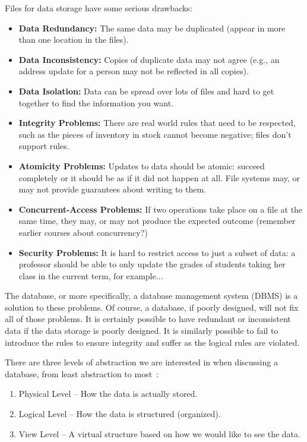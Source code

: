 Files for data storage have some serious drawbacks:
\begin{itemize}
	\item \textbf{Data Redundancy:} The same data may be duplicated (appear in more than one location in the files).
	\item \textbf{Data Inconsistency:} Copies of duplicate data may not agree (e.g., an address update for a person may not be reflected in all copies).
	\item \textbf{Data Isolation:} Data can be spread over lots of files and hard to get together to find the information you want.
	\item \textbf{Integrity Problems:} There are real world rules that need to be respected, such as the pieces of inventory in stock cannot become negative; files don't support rules.
	\item \textbf{Atomicity Problems:} Updates to data should be atomic: succeed completely or it should be as if it did not happen at all. File systems may, or may not provide guarantees about writing to them.
	\item \textbf{Concurrent-Access Problems:} If two operations take place on a file at the same time, they may, or may not produce the expected outcome (remember earlier courses about concurrency?)
	\item \textbf{Security Problems:} It is hard to restrict access to just a subset of data: a professor should be able to only update the grades of students taking her class in the current term, for example...
\end{itemize}

The database, or more specifically, a database management system (DBMS) is a solution to these problems. Of course, a database, if poorly designed, will not fix all of those problems. It is certainly possible to have redundant or inconsistent data if the data storage is poorly designed. It is similarly possible to fail to introduce the rules to ensure integrity and suffer as the logical rules are violated. 

There are three levels of abstraction we are interested in when discussing a database, from least abstraction to most~\cite{dsc}:

\begin{enumerate}
	\item Physical Level -- How the data is actually stored.
	\item Logical Level -- How the data is structured (organized).
	\item View Level -- A virtual structure based on how we would like to see the data. 
\end{enumerate}

